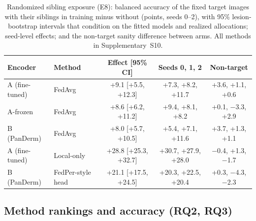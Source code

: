 \documentclass[VANCOUVER,Times1COL]{WileyNJDv5}
\begin{document}
\begin{table}[!t]
\centering
\caption{Randomized sibling exposure (E8): balanced accuracy of the fixed target images with their siblings in
training minus without (points, seeds 0--2), with 95\% lesion-bootstrap intervals that condition on the fitted
models and realized allocations; seed-level effects; and the non-target sanity difference between arms.
All methods in Supplementary~S10.}
\label{tab:exposure}
\setlength{\tabcolsep}{3pt}
\begin{tabular}{@{}llccc@{}}
\toprule
Encoder & Method & Effect [95\% CI] & Seeds 0, 1, 2 & Non-target \\
\midrule
A (fine-tuned) & FedAvg & +9.1 [+5.5, +12.3] & +7.3, +8.2, +11.7 & +3.6, +1.1, +0.6 \\
A-frozen & FedAvg & +8.6 [+6.2, +11.2] & +9.4, +8.1, +8.2 & +0.1, $-$3.3, +2.9 \\
B (PanDerm) & FedAvg & +8.0 [+5.7, +10.5] & +5.4, +7.1, +11.6 & +3.7, +1.3, +1.1 \\
A (fine-tuned) & Local-only & +28.8 [+25.3, +32.7] & +30.7, +27.9, +28.0 & $-$0.4, +1.3, $-$1.7 \\
B (PanDerm) & FedPer-style head & +21.1 [+17.5, +24.5] & +20.3, +22.5, +20.4 & +0.3, $-$4.3, $-$2.3 \\
\bottomrule
\end{tabular}
\end{table}


\subsection{Method rankings and accuracy (RQ2, RQ3)}
\label{sec:res-rankings}
\end{document}

